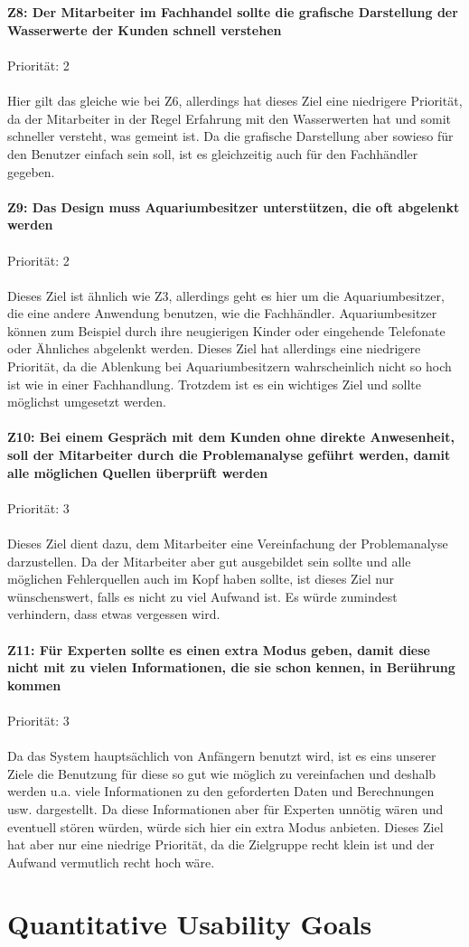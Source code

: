 \\ \\
\textbf{Z8: Der Mitarbeiter im Fachhandel sollte die grafische Darstellung der Wasserwerte der Kunden schnell verstehen}
\\ \\
Priorität: 2
\\ \\
Hier gilt das gleiche wie bei Z6, allerdings hat dieses Ziel eine niedrigere Priorität, da der Mitarbeiter in der Regel Erfahrung mit den Wasserwerten hat und somit schneller versteht, was gemeint ist. Da die grafische Darstellung aber sowieso für den Benutzer einfach sein soll, ist es gleichzeitig auch für den Fachhändler gegeben.
\\ \\
\textbf{Z9: Das Design muss Aquariumbesitzer unterstützen, die oft abgelenkt werden}
\\ \\
Priorität: 2
\\ \\
Dieses Ziel ist ähnlich wie Z3, allerdings geht es hier um die Aquariumbesitzer, die eine andere Anwendung benutzen, wie die Fachhändler. Aquariumbesitzer können zum Beispiel durch ihre neugierigen Kinder oder eingehende Telefonate oder Ähnliches abgelenkt werden. Dieses Ziel hat allerdings eine niedrigere Priorität, da die Ablenkung bei Aquariumbesitzern wahrscheinlich nicht so hoch ist wie in einer Fachhandlung. Trotzdem ist es ein wichtiges Ziel und sollte möglichst umgesetzt werden.
\\ \\
\textbf{Z10: Bei einem Gespräch mit dem Kunden ohne direkte Anwesenheit, soll der Mitarbeiter durch die Problemanalyse geführt werden, damit alle möglichen Quellen überprüft werden}
\\ \\
Priorität: 3
\\ \\
Dieses Ziel dient dazu, dem Mitarbeiter eine Vereinfachung der Problemanalyse darzustellen. Da der Mitarbeiter aber gut ausgebildet sein sollte und alle möglichen Fehlerquellen auch im Kopf haben sollte, ist dieses Ziel nur wünschenswert, falls es nicht zu viel Aufwand ist. Es würde zumindest verhindern, dass etwas vergessen wird.
\\ \\
\textbf{Z11: Für Experten sollte es einen extra Modus geben, damit diese nicht mit zu vielen Informationen, die sie schon kennen, in Berührung kommen}
\\ \\
Priorität: 3
\\ \\
Da das System hauptsächlich von Anfängern benutzt wird, ist es eins unserer Ziele die Benutzung für diese so gut wie möglich zu vereinfachen und deshalb werden u.a. viele Informationen zu den geforderten Daten und Berechnungen usw. dargestellt. Da diese Informationen aber für Experten unnötig wären und eventuell stören würden, würde sich hier ein extra Modus anbieten. Dieses Ziel hat aber nur eine niedrige Priorität, da die Zielgruppe recht klein ist und der Aufwand vermutlich recht hoch wäre.

\section{Quantitative Usability Goals}
